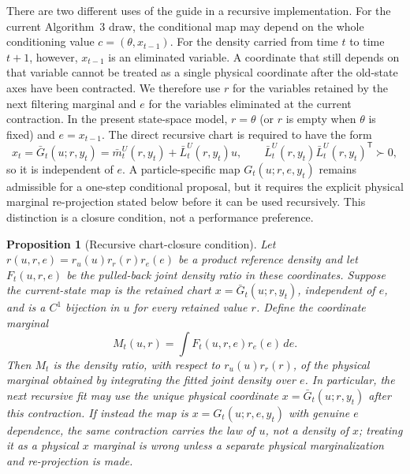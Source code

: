 \documentclass[11pt]{article}
\newtheorem{proposition}{Proposition}
\begin{document}
There are two different uses of the guide in a recursive implementation.  For
the current Algorithm~3 draw, the conditional map may depend on the whole
conditioning value $c=(\theta,x_{t-1})$.  For the density carried from time
$t$ to time $t+1$, however, $x_{t-1}$ is an eliminated variable.  A coordinate
that still depends on that variable cannot be treated as a single physical
coordinate after the old-state axes have been contracted.  We therefore use
$r$ for the variables retained by the next filtering marginal and $e$ for the
variables eliminated at the current contraction.  In the present state-space
model, $r=\theta$ (or $r$ is empty when $\theta$ is fixed) and
$e=x_{t-1}$.  The direct recursive chart is required to have the form
\begin{equation}
  x_t=\bar G_t(u;r,y_t)=\bar m_t^U(r,y_t)+\bar L_t^U(r,y_t)u,
  \qquad \bar L_t^U(r,y_t)\bar L_t^U(r,y_t)^\mathsf T\succ0,
  \label{eq:algthree-retained-guide-map}
\end{equation}
so it is independent of $e$.  A particle-specific map
$G_t(u;r,e,y_t)$ remains admissible for a one-step conditional proposal, but
it requires the explicit physical marginal re-projection stated below before
it can be used recursively.  This distinction is a closure condition, not a
performance preference.

\begin{proposition}[Recursive chart-closure condition]
\label{prop:algthree-chart-closure}
Let $r(u,r,e)=r_u(u)r_r(r)r_e(e)$ be a product reference density and let
$F_t(u,r,e)$ be the pulled-back joint density ratio in these coordinates.
Suppose the current-state map is the retained chart
$x=\bar G_t(u;r,y_t)$, independent of $e$, and is a $C^1$ bijection in $u$
for every retained value $r$.  Define the coordinate marginal
\begin{equation}
  M_t(u,r)=\int F_t(u,r,e)r_e(e)\,de.
  \label{eq:algthree-retained-coordinate-marginal}
\end{equation}
Then $M_t$ is the density ratio, with respect to $r_u(u)r_r(r)$, of the
physical marginal obtained by integrating the fitted joint density over
$e$.  In particular, the next recursive fit may use the unique physical
coordinate $x=\bar G_t(u;r,y_t)$ after this contraction.  If instead the map is
$x=G_t(u;r,e,y_t)$ with genuine $e$ dependence, the same contraction carries
the law of $u$, not a density of $x$; treating it as a physical $x$ marginal is
wrong unless a separate physical marginalization and re-projection is made.
\end{proposition}
\end{document}
